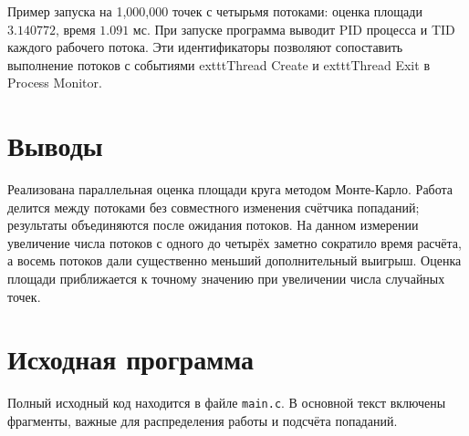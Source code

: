 \documentclass[unicode, 12pt, a4paper, oneside, fleqn]{article}
\begin{document}
Пример запуска на 1,000,000 точек с четырьмя потоками: оценка площади $3.140772$, время $1.091$ мс. При запуске программа выводит PID процесса и TID каждого рабочего потока. Эти идентификаторы позволяют сопоставить выполнение потоков с событиями 	exttt{Thread Create} и 	exttt{Thread Exit} в Process Monitor.

\section{Выводы}
Реализована параллельная оценка площади круга методом Монте-Карло. Работа делится между потоками без совместного изменения счётчика попаданий; результаты объединяются после ожидания потоков. На данном измерении увеличение числа потоков с одного до четырёх заметно сократило время расчёта, а восемь потоков дали существенно меньший дополнительный выигрыш. Оценка площади приближается к точному значению при увеличении числа случайных точек.

\pagebreak

\section{Исходная программа}
Полный исходный код находится в файле \texttt{main.c}. В основной текст включены фрагменты, важные для распределения работы и подсчёта попаданий.
\end{document}
